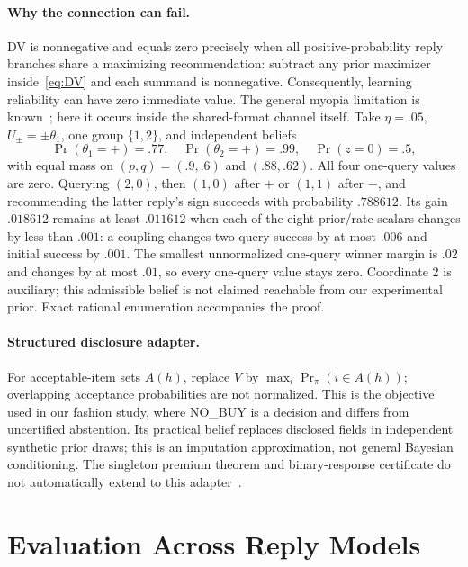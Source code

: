 \documentclass[sigconf,anonymous,review]{acmart}
\begin{document}
\paragraph{Why the connection can fail.}
DV is nonnegative and equals zero precisely when all positive-probability reply branches share a maximizing recommendation: subtract any prior maximizer inside~\eqref{eq:DV} and each summand is nonnegative. Consequently, learning reliability can have zero immediate value. The general myopia limitation is known~\cite{boutilier2003active}; here it occurs inside the shared-format channel itself. Take $\eta=.05$, $U_\pm=\pm\theta_1$, one group $\{1,2\}$, and independent beliefs
\[
 \Pr(\theta_1=+)=.77,\quad \Pr(\theta_2=+)=.99,\quad \Pr(z=0)=.5,
\]
with equal mass on $(p,q)=(.9,.6)$ and $(.88,.62)$. All four one-query values are zero. Querying $(2,0)$, then $(1,0)$ after $+$ or $(1,1)$ after $-$, and recommending the latter reply's sign succeeds with probability $.788612$. Its gain $.018612$ remains at least $.011612$ when each of the eight prior/rate scalars changes by less than $.001$: a coupling changes two-query success by at most $.006$ and initial success by $.001$. The smallest unnormalized one-query winner margin is $.02$ and changes by at most $.01$, so every one-query value stays zero. Coordinate 2 is auxiliary; this admissible belief is not claimed reachable from our experimental prior. Exact rational enumeration accompanies the proof.

\paragraph{Structured disclosure adapter.}
For acceptable-item sets $A(h)$, replace $V$ by $\max_i\Pr_\pi(i\in A(h))$; overlapping acceptance probabilities are not normalized. This is the objective used in our fashion study, where NO\_BUY is a decision and differs from uncertified abstention. Its practical belief replaces disclosed fields in independent synthetic prior draws; this is an imputation approximation, not general Bayesian conditioning. The singleton premium theorem and binary-response certificate do not automatically extend to this adapter~\cite{degenne2019multiple}.

\section{Evaluation Across Reply Models}

\end{document}
